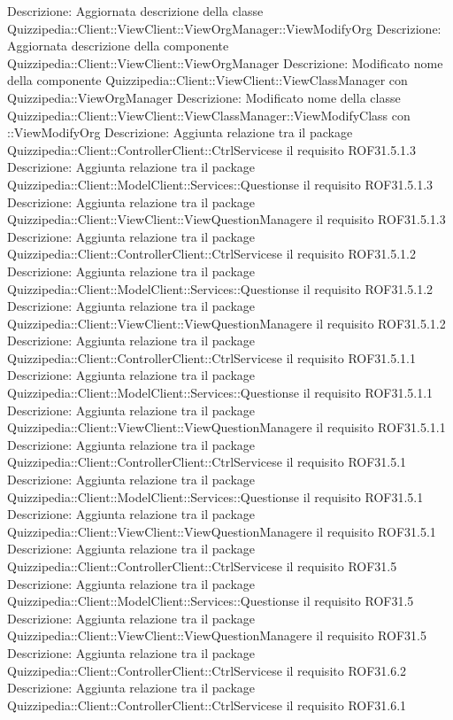 Descrizione: Aggiornata descrizione della classe Quizzipedia::Client::ViewClient::ViewOrgManager::ViewModifyOrg 
Descrizione: Aggiornata descrizione della componente Quizzipedia::Client::ViewClient::ViewOrgManager 
Descrizione: Modificato nome della componente Quizzipedia::Client::ViewClient::ViewClassManager con Quizzipedia::ViewOrgManager 
Descrizione: Modificato nome della classe Quizzipedia::Client::ViewClient::ViewClassManager::ViewModifyClass con ::ViewModifyOrg 
Descrizione: Aggiunta relazione tra il package Quizzipedia::Client::ControllerClient::CtrlServicese il requisito ROF31.5.1.3 
Descrizione: Aggiunta relazione tra il package Quizzipedia::Client::ModelClient::Services::Questionse il requisito ROF31.5.1.3 
Descrizione: Aggiunta relazione tra il package Quizzipedia::Client::ViewClient::ViewQuestionManagere il requisito ROF31.5.1.3 
Descrizione: Aggiunta relazione tra il package Quizzipedia::Client::ControllerClient::CtrlServicese il requisito ROF31.5.1.2 
Descrizione: Aggiunta relazione tra il package Quizzipedia::Client::ModelClient::Services::Questionse il requisito ROF31.5.1.2 
Descrizione: Aggiunta relazione tra il package Quizzipedia::Client::ViewClient::ViewQuestionManagere il requisito ROF31.5.1.2 
Descrizione: Aggiunta relazione tra il package Quizzipedia::Client::ControllerClient::CtrlServicese il requisito ROF31.5.1.1 
Descrizione: Aggiunta relazione tra il package Quizzipedia::Client::ModelClient::Services::Questionse il requisito ROF31.5.1.1 
Descrizione: Aggiunta relazione tra il package Quizzipedia::Client::ViewClient::ViewQuestionManagere il requisito ROF31.5.1.1 
Descrizione: Aggiunta relazione tra il package Quizzipedia::Client::ControllerClient::CtrlServicese il requisito ROF31.5.1 
Descrizione: Aggiunta relazione tra il package Quizzipedia::Client::ModelClient::Services::Questionse il requisito ROF31.5.1 
Descrizione: Aggiunta relazione tra il package Quizzipedia::Client::ViewClient::ViewQuestionManagere il requisito ROF31.5.1 
Descrizione: Aggiunta relazione tra il package Quizzipedia::Client::ControllerClient::CtrlServicese il requisito ROF31.5 
Descrizione: Aggiunta relazione tra il package Quizzipedia::Client::ModelClient::Services::Questionse il requisito ROF31.5 
Descrizione: Aggiunta relazione tra il package Quizzipedia::Client::ViewClient::ViewQuestionManagere il requisito ROF31.5 
Descrizione: Aggiunta relazione tra il package Quizzipedia::Client::ControllerClient::CtrlServicese il requisito ROF31.6.2 
Descrizione: Aggiunta relazione tra il package Quizzipedia::Client::ControllerClient::CtrlServicese il requisito ROF31.6.1 
